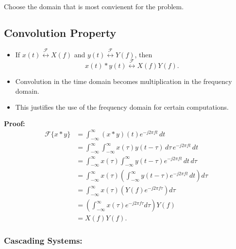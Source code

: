\begin{warning}
    Choose the domain that is most convienent for the problem.
\end{warning}

\subsection{Convolution Property}
\begin{definition}
    \begin{itemize}
        \item If \( x(t) \overset{\mathcal{F}}{\leftrightarrow} X(f) \) and \( y(t) \overset{\mathcal{F}}{\leftrightarrow} Y(f) \), then
        \[
        x(t) * y(t) \overset{\mathcal{F}}{\leftrightarrow} X(f) Y(f).
        \]
        \item Convolution in the time domain becomes multiplication in the frequency domain.
        \item This justifies the use of the frequency domain for certain computations.
    \end{itemize}
\end{definition}

\begin{derivation}
    \textbf{Proof:}
    \begin{align*}
        \mathcal{F}\{x * y\} &= \int_{-\infty}^{\infty} (x * y)(t) e^{-j 2 \pi f t} \, dt \\
        &= \int_{-\infty}^{\infty} \int_{-\infty}^{\infty} x(\tau) y(t - \tau) \, d\tau \, e^{-j 2 \pi f t} \, dt \\
        &= \int_{-\infty}^{\infty} x(\tau) \int_{-\infty}^{\infty} y(t - \tau) e^{-j 2 \pi f t} \, dt \, d\tau \\
        &= \int_{-\infty}^{\infty} x(\tau) \left( \int_{-\infty}^{\infty} y(t - \tau) e^{-j 2 \pi f t} \, dt \right) d\tau \\
        &= \int_{-\infty}^{\infty} x(\tau) \left( Y(f) e^{-j 2 \pi f \tau} \right) d\tau \\
        &= \left( \int_{-\infty}^{\infty} x(\tau) e^{-j 2 \pi f \tau} d\tau \right) Y(f) \\
        &= X(f) Y(f).
    \end{align*}
\end{derivation}

\subsubsection{Cascading Systems:}
\begin{definition}
\end{definition}


